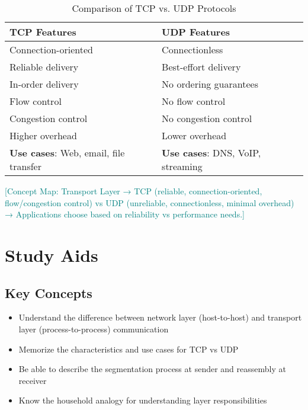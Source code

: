 \documentclass[12pt]{article}
\begin{document}
\begin{table}[h]
    \centering
    \begin{tabular}{p{}p{}}
        \toprule
        \textbf{TCP Features}                         & \textbf{UDP Features}                    \\
        \midrule
        Connection-oriented                           & Connectionless                           \\
        Reliable delivery                             & Best-effort delivery                     \\
        In-order delivery                             & No ordering guarantees                   \\
        Flow control                                  & No flow control                          \\
        Congestion control                            & No congestion control                    \\
        Higher overhead                               & Lower overhead                           \\
        \textbf{Use cases}: Web, email, file transfer & \textbf{Use cases}: DNS, VoIP, streaming \\
        \bottomrule
    \end{tabular}
    \caption{Comparison of TCP vs. UDP Protocols}
    \label{tab:tcp_vs_udp}
\end{table}

\textcolor{teal}{[Concept Map: Transport Layer → TCP (reliable, connection-oriented, flow/congestion control) vs UDP (unreliable, connectionless, minimal overhead) → Applications choose based on reliability vs performance needs.]}

\section{Study Aids}

\subsection{Key Concepts}
\begin{itemize}
    \item Understand the difference between network layer (host-to-host) and transport layer (process-to-process) communication
    \item Memorize the characteristics and use cases for TCP vs UDP
    \item Be able to describe the segmentation process at sender and reassembly at receiver
    \item Know the household analogy for understanding layer responsibilities
\end{itemize}
\end{document}
